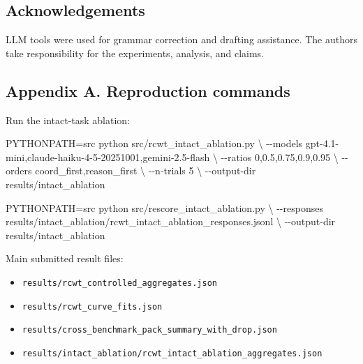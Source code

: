 \documentclass[
  runningheads]{llncs}
\newenvironment{Shaded}{}{}
\newcommand{\AttributeTok}[1]{\textcolor[rgb]{0.49,0.56,0.16}{#1}}
\newcommand{\DataTypeTok}[1]{\textcolor[rgb]{0.56,0.13,0.00}{#1}}
\newcommand{\ExtensionTok}[1]{#1}
\newcommand{\NormalTok}[1]{#1}
\newcommand{\OperatorTok}[1]{\textcolor[rgb]{0.40,0.40,0.40}{#1}}
\newcommand{\VariableTok}[1]{\textcolor[rgb]{0.10,0.09,0.49}{#1}}
\providecommand{\tightlist}{%
  \setlength{\itemsep}{0pt}\setlength{\parskip}{0pt}}
\begin{document}
\subsection{Acknowledgements}\label{acknowledgements}

LLM tools were used for grammar correction and drafting assistance. The
authors take responsibility for the experiments, analysis, and claims.

\subsection{Appendix A. Reproduction
commands}\label{appendix-a.-reproduction-commands}

Run the intact-task ablation:

\begin{Shaded}
\begin{Highlighting}[]
\VariableTok{PYTHONPATH}\OperatorTok{=}\NormalTok{src }\ExtensionTok{python}\NormalTok{ src/rcwt\_intact\_ablation.py }\DataTypeTok{\textbackslash{}}
  \AttributeTok{{-}{-}models}\NormalTok{ gpt{-}4.1{-}mini,claude{-}haiku{-}4{-}5{-}20251001,gemini{-}2.5{-}flash }\DataTypeTok{\textbackslash{}}
  \AttributeTok{{-}{-}ratios}\NormalTok{ 0,0.5,0.75,0.9,0.95 }\DataTypeTok{\textbackslash{}}
  \AttributeTok{{-}{-}orders}\NormalTok{ coord\_first,reason\_first }\DataTypeTok{\textbackslash{}}
  \AttributeTok{{-}{-}n{-}trials}\NormalTok{ 5 }\DataTypeTok{\textbackslash{}}
  \AttributeTok{{-}{-}output{-}dir}\NormalTok{ results/intact\_ablation}

\VariableTok{PYTHONPATH}\OperatorTok{=}\NormalTok{src }\ExtensionTok{python}\NormalTok{ src/rescore\_intact\_ablation.py }\DataTypeTok{\textbackslash{}}
  \AttributeTok{{-}{-}responses}\NormalTok{ results/intact\_ablation/rcwt\_intact\_ablation\_responses.jsonl }\DataTypeTok{\textbackslash{}}
  \AttributeTok{{-}{-}output{-}dir}\NormalTok{ results/intact\_ablation}
\end{Highlighting}
\end{Shaded}

Main submitted result files:

\begin{itemize}
\tightlist
\item
  \texttt{results/rcwt\_controlled\_aggregates.json}
\item
  \texttt{results/rcwt\_curve\_fits.json}
\item
  \texttt{results/cross\_benchmark\_pack\_summary\_with\_drop.json}
\item
  \texttt{results/intact\_ablation/rcwt\_intact\_ablation\_aggregates.json}
\end{itemize}
\end{document}
